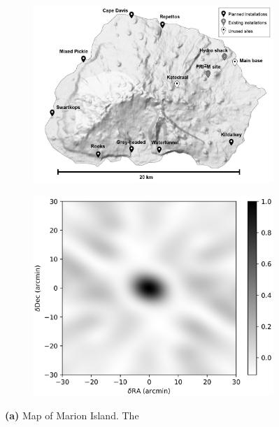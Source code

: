 \documentclass{ws-jai}
\begin{document}
\begin{figure}
    \centering
    \begin{subfigure}[t]{0.6\textwidth}
        \centering
        \includegraphics[width=\linewidth]{Figures/marion_map/marion_map_annotated.jpg} 
        \caption{} \label{Fig:marion_map}
    \end{subfigure}
    \hfill
    \begin{subfigure}[t]{0.39\textwidth}
      \centering
        \includegraphics[width=\linewidth]{Figures/marion_beam_huts_2020.jpg}
        \caption{} \label{Fig:marion_beam}
    \end{subfigure}
    \caption{{\bf (a)} Map of Marion Island.  The
}
\end{figure}
\end{document}
